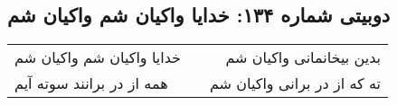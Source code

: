 \begin{center}
\section*{دوبیتی شماره ۱۳۴: خدایا واکیان شم واکیان شم}
\label{sec:134}
\begin{longtable}{l p{0.5cm} r}
خدایا واکیان شم واکیان شم
&&
بدین بیخانمانی واکیان شم
\\
همه از در برانند سوته آیم
&&
ته که از در برانی واکیان شم
\\
\end{longtable}
\end{center}

